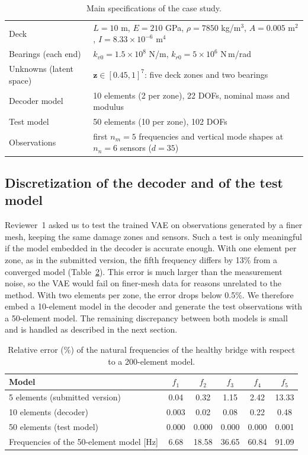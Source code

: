 \documentclass[11pt]{article}
\newcommand{\z}{\mathbf{z}}
\begin{document}
\begin{table}[H]
\centering\small
\caption{Main specifications of the case study.}
\label{tab:specs}
\begin{tabular}{p{4.6cm}p{10.2cm}}
\toprule
Deck & $L=10$ m, $E=210$ GPa, $\rho=7850$ kg/m$^3$, $A=0.005$ m$^2$, $I=8.33\times10^{-6}$ m$^4$ \\
Bearings (each end) & $k_{v0}=1.5\times10^{8}$ N/m, $k_{r0}=5\times10^{6}$ N\,m/rad \\
Unknowns (latent space) & $\z\in[0.45,1]^7$: five deck zones and two bearings \\
Decoder model & 10 elements (2 per zone), 22 DOFs, nominal mass and modulus \\
Test model & 50 elements (10 per zone), 102 DOFs \\
Observations & first $n_m=5$ frequencies and vertical mode shapes at $n_n=6$ sensors ($d=35$) \\
\bottomrule
\end{tabular}
\end{table}

\subsection{Discretization of the decoder and of the test model}

Reviewer~1 asked us to test the trained VAE on observations generated by a finer mesh, keeping the same damage zones
and sensors. Such a test is only meaningful if the model embedded in the decoder is accurate enough. With one element
per zone, as in the submitted version, the fifth frequency differs by 13\% from a converged model
(Table~\ref{tab:mesh}). This error is much larger than the measurement noise, so the VAE would fail on finer-mesh data
for reasons unrelated to the method. With two elements per zone, the error drops below 0.5\%. We therefore embed a
10-element model in the decoder and generate the test observations with a 50-element model. The remaining
discrepancy between both models is small and is handled as described in the next section.

\begin{table}[H]
\centering\small
\caption{Relative error (\%) of the natural frequencies of the healthy bridge with respect to a 200-element model.}
\label{tab:mesh}
\begin{tabular}{lccccc}
\toprule
Model & $f_1$ & $f_2$ & $f_3$ & $f_4$ & $f_5$ \\
\midrule
5 elements (submitted version) & 0.04 & 0.32 & 1.15 & 2.42 & 13.33 \\
10 elements (decoder) & 0.003 & 0.02 & 0.08 & 0.22 & 0.48 \\
50 elements (test model) & 0.000 & 0.000 & 0.000 & 0.000 & 0.001 \\
\midrule
Frequencies of the 50-element model [Hz] & 6.68 & 18.58 & 36.65 & 60.84 & 91.09 \\
\bottomrule
\end{tabular}
\end{table}
\end{document}
